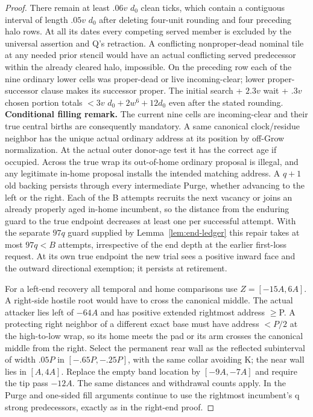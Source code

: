 \begin{proof}
There remain at least \(.06v\) \(d_0\) clean ticks, which contain a contiguous interval of length \(.05v\) \(d_0\) after deleting four-unit rounding and four preceding halo rows. At all its dates every competing served member is excluded by the universal assertion and Q's retraction. A conflicting nonproper-dead nominal tile at any needed prior stencil would have an actual conflicting served predecessor within the already cleared halo, impossible. On the preceding row each of the nine ordinary lower cells was proper-dead or live incoming-clear; lower proper-successor clause makes its successor proper. The initial search + \(2.3v\) wait + \(.3v\) chosen portion totals \(<3v\) \(d_0+2w^6+12d_0\) even after the stated rounding. \textbf{Conditional filling remark.} The current nine cells are incoming-clear and their true central births are consequently mandatory. A same canonical clock/residue neighbor has the unique actual ordinary address at its position by off-Grow normalization. At the actual outer donor-age test it has the correct age if occupied. Across the true wrap its out-of-home ordinary proposal is illegal, and any legitimate in-home proposal installs the intended matching address. A \(q+1\) old backing persists through every intermediate Purge, whether advancing to the left or the right. Each of the B attempts recruits the next vacancy or joins an already properly aged in-home incumbent, so the distance from the enduring guard to the true endpoint decreases at least one per successful attempt. With the separate \(97q\) guard supplied by Lemma~\ref{lem:end-ledger} this repair takes at most \(97q<B\) attempts, irrespective of the end depth at the earlier first-loss request. At its own true endpoint the new trial sees a positive inward face and the outward directional exemption; it persists at retirement.

For a left-end recovery all temporal and home comparisons use \(Z=[- 15A,6A]\). A right-side hostile root would have to cross the canonical middle. The actual attacker lies left of \(- 64A\) and has positive extended rightmost address \(\ge\)P. A protecting right neighbor of a different exact base must have address \(<P/2\) at the high-to-low wrap, so its home meets the pad or its arm crosses the canonical middle from the right. Select the permanent rear wall as the reflected subinterval of width \(.05P\) in \([- .65P,- .25P]\), with the same collar avoiding K; the near wall lies in \([A,4A]\). Replace the empty band location by \([- 9A,- 7A]\) and require the tip pass \(- 12A\). The same distances and withdrawal counts apply. In the Purge and one-sided fill arguments continue to use the rightmost incumbent's q strong predecessors, exactly as in the right-end proof.
\end{proof}

